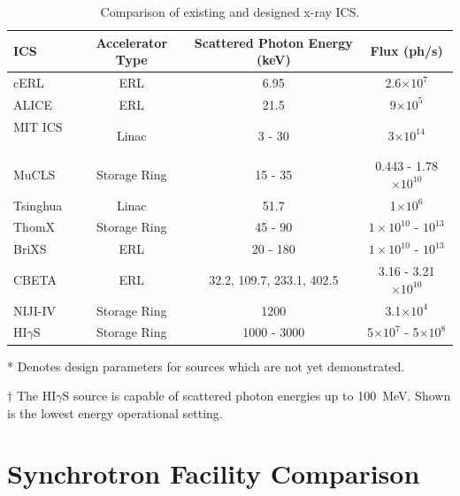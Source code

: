 \documentclass[../main.tex]{subfiles}
\begin{document}
\begin{table}[!h]
\caption{Comparison of existing and designed x-ray ICS.}
\begin{threeparttable}
\begin{tabular}{lccc}
\hline\hline
ICS & Accelerator Type & Scattered Photon Energy (keV) & Flux (ph/s) \\
\hline
cERL \cite{akagi2016narrow} & ERL & 6.95 & 2.6$\times 10^{7}$ \\ 
ALICE \cite{priebe2008inverse,priebe2010first} & ERL & 21.5 & 9$\times 10^{5}$ \\
MIT ICS\tnote{*} ~\cite{graves2014compact} & Linac & 3 - 30 & 3$\times 10^{14}$ \\
MuCLS \cite{eggl2016munich} & Storage Ring & 15 - 35 & 0.443 - 1.78$\times 10^{10}$ \\ 
Tsinghua \cite{du2013generation} & Linac & 51.7 & 1$\times 10^{6}$ \\
ThomX\tnote{*} ~\cite{variola2014thomx,dupraz2020thomx} & Storage Ring & 45 - 90 & $1\times 10^{10}$ - $10^{13}$ \\
BriXS\tnote{*} ~\cite{faillace2019status,cardarelli2020brixs} & ERL & 20 - 180 & $1\times 10^{10}$ - $10^{13}$ \\
CBETA\tnote{*} & ERL & 32.2, 109.7, 233.1, 402.5 & 3.16 - 3.21$\times 10^{10}$ \\ 
NIJI-IV \cite{sei2017demonstration} & Storage Ring & 1200 & 3.1$\times 10^{4}$ \\ 
HI$\gamma$S\tnote{$\dagger$} ~\cite{weller2009research} & Storage Ring & 1000 - 3000 & 5$\times 10^{7}$ - 5$\times 10^{8}$ \\
\hline\hline
\end{tabular}
\begin{tablenotes}
\item[*]{Denotes design parameters for sources which are not yet demonstrated.}
\item[$\dagger$]{The HI$\gamma$S source is capable of scattered photon energies up to 100~MeV. Shown is the lowest energy operational setting.}
\end{tablenotes}
\end{threeparttable}
\label{tab:xray_ICS_comparison}
\end{table}

\section{Synchrotron Facility Comparison}
\end{document}
